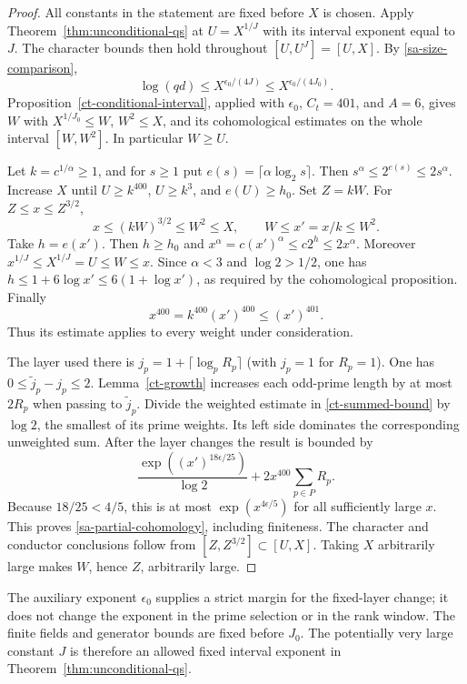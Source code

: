 \begin{proof}
All constants in the statement are fixed before $X$ is chosen.
Apply Theorem~\ref{thm:unconditional-qs} at $U=X^{1/J}$ with its interval
exponent equal to $J$. The character bounds then hold throughout
$[U,U^J]=[U,X]$. By \eqref{sa-size-comparison},
\[
 \log(qd)\le X^{\epsilon_0/(4J)}
              \le X^{\epsilon_0/(4J_0)}.
\]
Proposition~\ref{ct-conditional-interval}, applied with
$\epsilon_0$, $C_t=401$, and $A=6$, gives $W$ with
$X^{1/J_0}\le W$, $W^2\le X$, and its cohomological estimates
on the whole interval $[W,W^2]$. In particular $W\ge U$.

Let $k=c^{1/\alpha}\ge1$, and for $s\ge1$ put
$e(s)=\lceil\alpha\log_2s\rceil$. Then
$s^\alpha\le2^{e(s)}\le2s^\alpha$.
Increase $X$ until $U\ge k^{400}$, $U\ge k^3$, and
$e(U)\ge h_0$. Set $Z=kW$. For $Z\le x\le Z^{3/2}$,
\[
 x\le(kW)^{3/2}\le W^2\le X,\qquad
 W\le x'=x/k\le W^2.
\]
Take $h=e(x')$. Then $h\ge h_0$ and
$x^\alpha=c(x')^\alpha\le c2^h\le2x^\alpha$.
Moreover $x^{1/J}\le X^{1/J}=U\le W\le x$.
Since $\alpha<3$ and $\log2>1/2$, one has
$h\le1+6\log x'\le6(1+\log x')$, as required by the
cohomological proposition. Finally
\[
                  x^{400}=k^{400}(x')^{400}\le(x')^{401}.
\]
Thus its estimate applies to every weight under consideration.

The layer used there is
$j_p=1+\lceil\log_pR_p\rceil$ (with $j_p=1$ for $R_p=1$).
One has $0\le\widetilde j_p-j_p\le2$.
Lemma~\ref{ct-growth} increases each odd-prime length by at
most $2R_p$ when passing to $\widetilde j_p$.
Divide the weighted estimate in
\eqref{ct-summed-bound} by $\log2$, the smallest of its prime
weights. Its left side dominates the corresponding unweighted
sum. After the layer changes the result is bounded by
\[
 \frac{\exp((x')^{18\epsilon/25})}{\log2}
       +2x^{400}\sum_{p\in P}R_p.
\]
Because $18/25<4/5$, this is at most
$\exp(x^{4\epsilon/5})$ for all sufficiently large $x$.
This proves \eqref{sa-partial-cohomology}, including finiteness.
The character and conductor conclusions follow from $[Z,Z^{3/2}]
\subset[U,X]$. Taking $X$ arbitrarily large makes $W$, hence $Z$,
arbitrarily large.
\end{proof}

The auxiliary exponent $\epsilon_0$ supplies a strict margin for the
fixed-layer change; it does not change the exponent in the prime
selection or in the rank window. The finite fields and generator bounds
are fixed before $J_0$. The potentially very large constant $J$ is
therefore an allowed fixed interval exponent in
Theorem~\ref{thm:unconditional-qs}.

